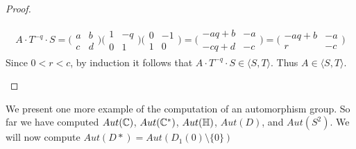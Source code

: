 \begin{proof}
\begin{enumerate}
    \begin{align*}
        A\cdot T^{-q} \cdot S= \bigg( \begin{matrix}
  a & b\\
  c & d
\end{matrix} \bigg) \bigg( \begin{matrix}
  1 & -q\\
  0 & 1
\end{matrix} \bigg) \bigg( \begin{matrix}
  0 & -1\\
  1 & 0
\end{matrix} \bigg) = \bigg( \begin{matrix}
   -aq+b & -a\\
  -cq+d & -c 
\end{matrix} \bigg) = \bigg( \begin{matrix}
   -aq+b & -a\\
  r & -c 
\end{matrix} \bigg)
    \end{align*}
Since $0 < r < c$, by induction it follows that $ A\cdot T^{-q} \cdot S \in \langle S,T \rangle$. Thus $ A \in \langle S,T \rangle$.
    
\end{enumerate}
\end{proof}

We present one more example of the computation of an automorphism group. So far we have computed $Aut(\mathbb{C})$, $Aut(\mathbb{C}^*)$, $Aut(\mathbb{H})$, $Aut(D)$, and $Aut(S^2)$. We will now compute $Aut(D*) = Aut(D_1 ( 0) \setminus \{ 0 \} )$

